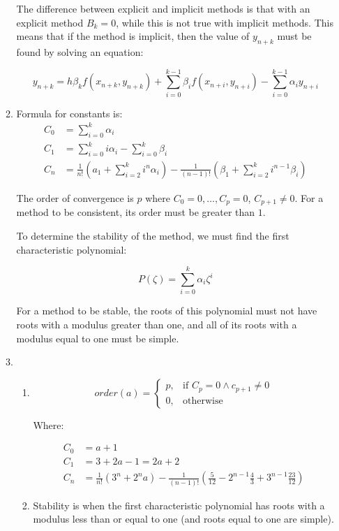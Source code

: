\documentclass{report}
\begin{document}
\begin{enumerate}
\begin{enumerate}
    The difference between explicit and implicit methods is that with
    an explicit method $B_k = 0$, while this is not true with implicit
    methods. This means that if the method is implicit, then the value
    of $y_{n+k}$ must be found by solving an equation:

    \[
      y_{n+k} = h\beta_kf(x_{n+k},y_{n+k}) + \sum\limits^{k-1}_{i=0}\beta_if(x_{n+i},y_{n+i}) - \sum\limits^{k-1}_{i=0}\alpha_iy_{n+i}
    \]
  \item Formula for constants is:
    \[
    \begin{split}
      C_0 &= \sum\limits^k_{i=0}\alpha_i\\
      C_1 &= \sum\limits^k_{i=0}i\alpha_i - \sum\limits^k_{i=0}\beta_i\\
      C_n &= \frac{1}{n!}\left(a_1 + \sum\limits^{k}_{i=2}i^n\alpha_i \right) - \frac{1}{(n-1)!}\left(\beta_1 + \sum\limits^k_{i=2}i^{n-1}\beta_i\right)
    \end{split}
    \]

    The order of convergence is $p$ where $C_0 = 0, \dots, C_p = 0$,
    $C_{p+1} \neq 0$. For a method to be consistent, its order must be
    greater than $1$.

    To determine the stability of the method, we must find the first
    characteristic polynomial:

    \[
      P(\zeta) = \sum\limits^k_{i=0}\alpha_i\zeta^i
    \]

    For a method to be stable, the roots of this polynomial must not
    have roots with a modulus greater than one, and all of its roots
    with a modulus equal to one must be simple.
  \item
    \begin{enumerate}
    \item

      \[
      order(a) =
      \begin{cases}
        p,& \text{if } C_p = 0 \wedge c_{p+1} \neq 0\\
        0,              & \text{otherwise}
        \end{cases}
      \]

      Where:

      \[
      \begin{split}
        C_0 &= a + 1\\
        C_1 &= 3 + 2a - 1 = 2a + 2\\
        C_n &= \frac{1}{n!}(3^n + 2^na) - \frac{1}{(n-1)!}\left(\frac{5}{12} - 2^{n-1}\frac{4}{3} + 3^{n-1}\frac{23}{12}\right)
      \end{split}  
      \]
    \item Stability is when the first characteristic polynomial has
      roots with a modulus less than or equal to one (and roots equal
      to one are simple).


\end{enumerate}
\end{enumerate}
\end{enumerate}
\end{document}
